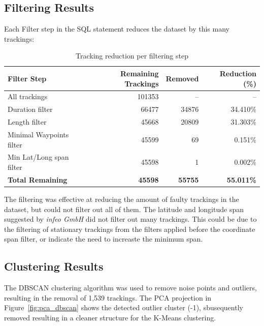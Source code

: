 \documentclass[a4paper,12pt,twoside]{scrreprt}
\begin{document}
\subsection{Filtering Results}
Each Filter step in the SQL statement reduces the dataset by this many
trackings:
\begin{table}[ht]
  \centering
  \begin{tabular}{|l|r|r|r|}
    \hline
    \textbf{Filter Step}     & \textbf{Remaining Trackings} &
    \textbf{Removed}
                             &
    \textbf{Reduction (\%)}
    \\
    \hline
    All trackings            & 101353                       & --
                             & --
    \\
    Duration filter          & 66477                        &
    34876
                             &
    34.410\%
    \\
    Length filter            & 45668                        &
    20809
                             &
    31.303\%
    \\
    Minimal Waypoints filter & 45599                        &
    69
                             &
    0.151\%
    \\
    Min Lat/Long span filter & 45598                        &
    1
                             &
    0.002\%
    \\
    \hline
    \textbf{Total Remaining} & \textbf{45598}               &
    \textbf{55755}
                             &
    \textbf{55.011\%}
    \\
    \hline
  \end{tabular}
  \caption{Tracking reduction per filtering step}
  \label{tab:filtering_summary}
\end{table}
\FloatBarrier

The filtering was effective at reducing the amount of faulty trackings in the
dataset, but could not filter out all of them.
The latitude and longitude span suggested by \textit{infeo GmbH} did not filter
out many trackings. This could be due to the filtering of stationary trackings
from the filters applied before the coordinate span filter, or indicate the
need to increaste the minimum span.

\subsection{Clustering Results}

The DBSCAN clustering algorithm was used to remove noise points and outliers,
resulting in the removal of 1,539 trackings.
The PCA projection in Figure~\ref{fig:pca_dbscan} shows the detected outlier
cluster (-1), sbusequently removed resulting in a cleaner structure for the
K-Means clustering.
\end{document}
